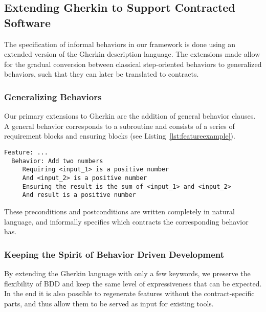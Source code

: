 \subsection{Extending Gherkin to Support Contracted Software}
\label{sub:Extending Gherkin to Support Contracted Software}

The specification of informal behaviors in our framework is done using an
extended version of the Gherkin description language.
The extensions made allow for the gradual conversion between classical step-oriented behaviors to generalized behaviors, such that they can later be translated to contracts.


\subsubsection{Generalizing Behaviors}
\label{sub:Generalizing Behaviors}

Our primary extensions to Gherkin are the addition of general
behavior clauses. A general behavior corresponds to a subroutine
and consists of a series of requirement blocks and ensuring blocks
(see Listing~\ref{lst:featureexample}).

\begin{lstlisting}[caption={General Behavior Description of Adding Natural Numbers},label={lst:featureexample}]
  Feature: ...
  Behavior: Add two numbers
     Requiring <input_1> is a positive number
     And <input_2> is a positive number
     Ensuring the result is the sum of <input_1> and <input_2>
     And result is a positive number
\end{lstlisting}


These preconditions and postconditions are written completely in
natural language, and informally specifies which contracts the corresponding
behavior has.

\subsubsection{Keeping the Spirit of Behavior Driven Development}
\label{ssub:Keeping the Spirit of Behavior Driven Development}
By extending the Gherkin language with only a few keywords, we preserve the flexibility of BDD and keep the same level of expressiveness that can be expected. In the end it is also possible to regenerate features without
the contract-specific parts, and thus allow them to be served as input for existing tools.


